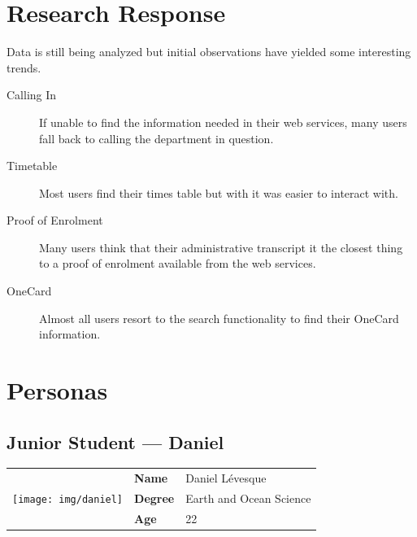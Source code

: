 \documentclass{article}
\begin{document}
\section{Research Response}

Data is still being analyzed but initial observations have yielded some interesting trends.

\begin{description}
  \item[Calling In] If unable to find the information needed in their web services, many users fall back to calling the department in question.
  \item[Timetable] Most users find their times table but with it was easier to interact with.
  \item[Proof of Enrolment] Many users think that their administrative transcript it the closest thing to a proof of enrolment available from the web services.
  \item[OneCard] Almost all users resort to the search functionality to find their OneCard information.
\end{description}



\section{Personas}


\subsection{Junior Student --- Daniel}

\begin{tabular}{lll}
     \multirow{3}{*}{\texttt{[image: img/daniel]}} & \textbf{Name} & Daniel L\'evesque \\
    & \textbf{Degree} & Earth and Ocean Science \\
    & \textbf{Age} & 22 \\
\end{tabular}
\end{document}
